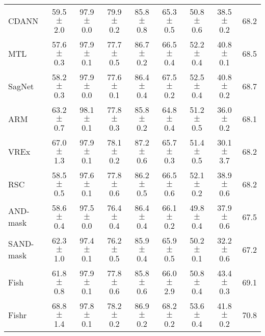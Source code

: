 \documentclass{article}
\begin{document}
\begin{center}
{\begin{tabular}{lcccccccc}
CDANN                     & 59.5 $\pm$ 2.0            & 97.9 $\pm$ 0.0            & 79.9 $\pm$ 0.2            & 85.8 $\pm$ 0.8            & 65.3 $\pm$ 0.5            & 50.8 $\pm$ 0.6            & 38.5 $\pm$ 0.2            & 68.2                      \\
MTL                       & 57.6 $\pm$ 0.3            & 97.9 $\pm$ 0.1            & 77.7 $\pm$ 0.5            & 86.7 $\pm$ 0.2            & 66.5 $\pm$ 0.4            & 52.2 $\pm$ 0.4            & 40.8 $\pm$ 0.1            & 68.5                      \\
SagNet                    & 58.2 $\pm$ 0.3            & 97.9 $\pm$ 0.0            & 77.6 $\pm$ 0.1            & 86.4 $\pm$ 0.4            & 67.5 $\pm$ 0.2            & 52.5 $\pm$ 0.4            & 40.8 $\pm$ 0.2            & 68.7                      \\
ARM                       & 63.2 $\pm$ 0.7            & 98.1 $\pm$ 0.1            & 77.8 $\pm$ 0.3            & 85.8 $\pm$ 0.2            & 64.8 $\pm$ 0.4            & 51.2 $\pm$ 0.5            & 36.0 $\pm$ 0.2            & 68.1                      \\
VREx                      & 67.0 $\pm$ 1.3            & 97.9 $\pm$ 0.1            & 78.1 $\pm$ 0.2            & 87.2 $\pm$ 0.6            & 65.7 $\pm$ 0.3            & 51.4 $\pm$ 0.5            & 30.1 $\pm$ 3.7            & 68.2                      \\
RSC                       & 58.5 $\pm$ 0.5            & 97.6 $\pm$ 0.1            & 77.8 $\pm$ 0.6            & 86.2 $\pm$ 0.5            & 66.5 $\pm$ 0.6            & 52.1 $\pm$ 0.2            & 38.9 $\pm$ 0.6            & 68.2                      \\
AND-mask                  & 58.6 $\pm$ 0.4            & 97.5 $\pm$ 0.0            & 76.4 $\pm$ 0.4            & 86.4 $\pm$ 0.4            & 66.1 $\pm$ 0.2            & 49.8 $\pm$ 0.4            & 37.9 $\pm$ 0.6            & 67.5                      \\
SAND-mask                 & 62.3 $\pm$ 1.0            & 97.4 $\pm$ 0.1            & 76.2 $\pm$ 0.5            & 85.9 $\pm$ 0.4            & 65.9 $\pm$ 0.5            & 50.2 $\pm$ 0.1            & 32.2 $\pm$ 0.6            & 67.2                      \\
Fish                      & 61.8 $\pm$ 0.8            & 97.9 $\pm$ 0.1            & 77.8 $\pm$ 0.6            & 85.8 $\pm$ 0.6            & 66.0 $\pm$ 2.9            & 50.8 $\pm$ 0.4            & 43.4 $\pm$ 0.3            & 69.1                      \\
Fishr                     & 68.8 $\pm$ 1.4            & 97.8 $\pm$ 0.1            & 78.2 $\pm$ 0.2            & 86.9 $\pm$ 0.2            & 68.2 $\pm$ 0.2            & 53.6 $\pm$ 0.4            & 41.8 $\pm$ 0.2            & 70.8                      \\
\bottomrule
\end{tabular}}
\end{center}
\end{document}

